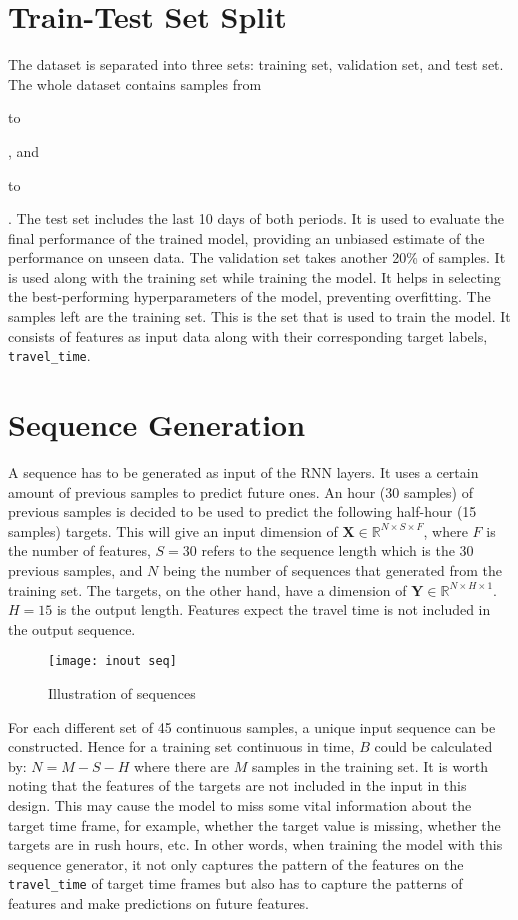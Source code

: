 \section{Train-Test Set Split}

The dataset is separated into three sets: training set, validation set, and test set. 
The whole dataset contains samples from \date{March, 1, 2016} to \date{June, 1, 2016}, and \date{March, 1, 2017} to \date{July, 1, 2017}. 
The test set includes the last 10 days of both periods. It is used to evaluate the final performance of the trained model, providing an unbiased estimate of the performance on unseen data. 
The validation set takes another 20\% of samples. It is used along with the training set while training the model. 
It helps in selecting the best-performing hyperparameters of the model, preventing overfitting. 
The samples left are the training set. This is the set that is used to train the model. It consists of features as input data along with their corresponding target labels, \verb|travel_time|.

\section{Sequence Generation}

A sequence has to be generated as input of the RNN layers. It uses a certain amount of previous samples to predict future ones. 
An hour (30 samples) of previous samples is decided to be used to predict the following half-hour (15 samples) targets. 
This will give an input dimension of $\mathbf{X} \in \mathbb{R}^{N\times S\times F}$, where $F$ is the number of features, $S = 30$ refers to the sequence length which is the 30 previous samples, and $N$ being the number of sequences that generated from the training set.
The targets, on the other hand, have a dimension of $\mathbf{Y} \in \mathbb{R}^{N\times H\times 1}$. $H = 15$ is the output length. Features expect the travel time is not included in the output sequence.

\begin{figure}[!htb]
    \centering
    \texttt{[image: inout seq]}
    \caption{Illustration of sequences}
    \label{Figure:inout_seq}
\end{figure}

For each different set of 45 continuous samples, a unique input sequence can be constructed. Hence for a training set continuous in time, $B$ could be calculated by:
$N = M - S - H$ where there are $M$ samples in the training set. It is worth noting that the features of the targets are not included in the input in this design. 
This may cause the model to miss some vital information about the target time frame, for example, whether the target value is missing, whether the targets are in rush hours, etc. 
In other words, when training the model with this sequence generator, it not only captures the pattern of the features on the \verb|travel_time| of target time frames but also has to capture the patterns of features and make predictions on future features.

